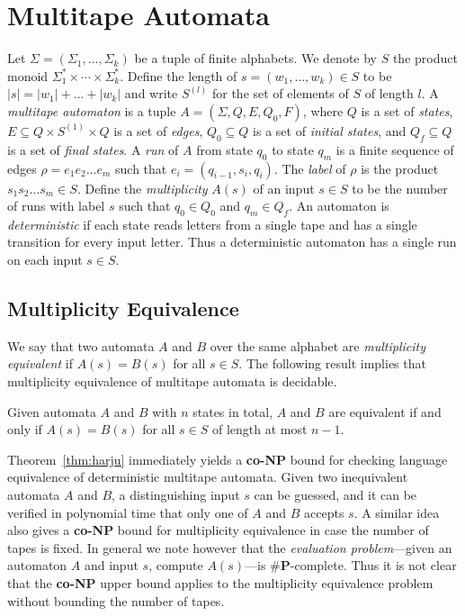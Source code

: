 \documentclass[runningheads]{llncs}
\begin{document}
\section{Multitape Automata}
\label{sec:multitape}
Let $\Sigma=(\Sigma_1,\ldots,\Sigma_k)$ be a tuple of finite
alphabets.  We denote by $S$ the product monoid $\Sigma_1^* \times
\cdots \times \Sigma_k^*$.  Define the length of $s=(w_1,\ldots,w_k)
\in S$ to be $|s|=|w_1|+\ldots+|w_k|$ and write $S^{(l)}$ for the set
of elements of $S$ of length $l$.  A \emph{multitape automaton} is a
tuple $A=(\Sigma,Q,E,Q_0,F)$, where $Q$ is a set of \emph{states}, $E
\subseteq Q\times S^{(1)} \times Q$ is a set of \emph{edges}, $Q_0
\subseteq Q$ is a set of \emph{initial states}, and $Q_f \subseteq Q$ is
a set of \emph{final states}.  A \emph{run} of $A$ from state $q_0$ to
state $q_m$ is a finite sequence of edges $\rho=e_1e_2 \ldots e_m$
such that $e_i = (q_{i-1},s_i,q_i)$.  The \emph{label} of $\rho$ is
the product $s_1s_2\ldots s_m \in S$.  Define the \emph{multiplicity}
$A(s)$ of an input $s \in S$ to be the number of runs with label $s$
such that $q_0\in Q_0$ and $q_m \in Q_f$.  An automaton is
\emph{deterministic} if each state reads letters from a single tape
and has a single transition for every input letter.  Thus a
deterministic automaton has a single run on each input $s\in S$.

\subsection{Multiplicity Equivalence}
We say that two automata $A$ and $B$ over the same alphabet are
\emph{multiplicity equivalent} if $A(s)=B(s)$ for all $s \in S$.  The
following result implies that multiplicity equivalence of multitape
automata is decidable.


\begin{theorem}
Given automata $A$ and $B$ with $n$ states in total, $A$
and $B$ are equivalent if and only if $A(s)=B(s)$ for all $s\in S$ of
length at most $n-1$.
\label{thm:harju}
\end{theorem}

Theorem~\ref{thm:harju} immediately yields a \textbf{co-NP} bound for
checking language equivalence of deterministic multitape automata.
Given two inequivalent automata $A$ and $B$, a distinguishing input
$s$ can be guessed, and it can be verified in polynomial time that
only one of $A$ and $B$ accepts $s$.  A similar idea also gives a
\textbf{co-NP} bound for multiplicity equivalence in case the number
of tapes is fixed.  In general we note however that the
\emph{evaluation problem}---given an automaton $A$ and input $s$,
compute $A(s)$---is $\# \mathbf{P}$-complete.  Thus it is not clear
that the \textbf{co-NP} upper bound applies to the multiplicity
equivalence problem without bounding the number of tapes.
\end{document}
